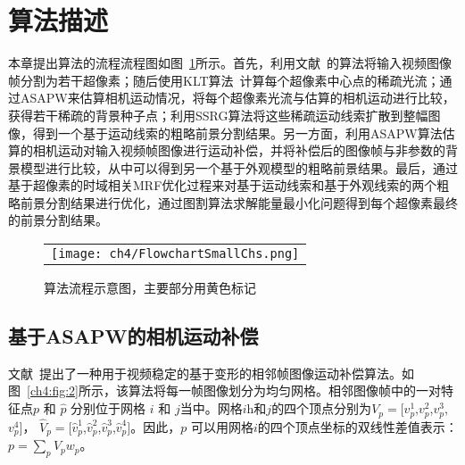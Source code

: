  \section{算法描述}
 \label{ch4:sec:algorithm}
 本章提出算法的流程流程图如图~\ref{ch4:fig:1}所示。首先，利用文献~的算法将输入视频图像帧分割为若干超像素；随后使用KLT算法~\cite{KLT}计算每个超像素中心点的稀疏光流；通过ASAPW来估算相机运动情况，将每个超像素光流与估算的相机运动进行比较，获得若干稀疏的背景种子点；利用SSRG算法将这些稀疏运动线索扩散到整幅图像，得到一个基于运动线索的粗略前景分割结果。另一方面，利用ASAPW算法估算的相机运动对输入视频帧图像进行运动补偿，并将补偿后的图像帧与非参数的背景模型进行比较，从中可以得到另一个基于外观模型的粗略前景结果。最后，通过基于超像素的时域相关MRF优化过程来对基于运动线索和基于外观线索的两个粗略前景分割结果进行优化，通过图割算法\cite{graphcut04}求解能量最小化问题得到每个超像素最终的前景分割结果。

\begin{figure}[!htbp]
\begin{center}
\begin{tabular}{c}
  \texttt{[image: ch4/FlowchartSmallChs.png]}
  \end{tabular}
\end{center}
\caption{算法流程示意图，主要部分用黄色标记}
\label{ch4:fig:1}       %
\end{figure}


\subsection{基于ASAPW的相机运动补偿}
\label{ch4:sec:sub:asap}
文献~提出了一种用于视频稳定的基于变形的相邻帧图像运动补偿算法。如图~\ref{ch4:fig:2}所示，该算法将每一帧图像划分为均匀网格。相邻图像帧中的一对特征点\(p\) 和 $\hat{p}$ 分别位于网格 \(i\) 和 \(j\)当中。网格$i$h和$j$的四个顶点分别为${V}_{p}=[{v}^{1}_{p}$,${v}^{2}_{p}$,${v}^{3}_{p}$,${v}^{4}_{p}]$， ${\hat{V}_{p}}=[\hat{v}^{1}_{p}$,$\hat{v}^{2}_{p}$,$\hat{v}^{3}_{p}$,$\hat{v}^{4}_{p}]$。因此，\(p\) 可以用网格\(i\)的四个顶点坐标的双线性差值表示：$p=\sum_{p}{{V}_{p}{w}_{p}}$。

